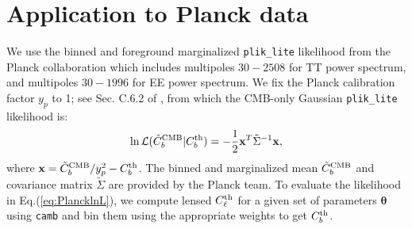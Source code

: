 \documentclass[amsmath, prd, reprint, aps]{revtex4-1}
\newcommand{\xv}{\textbf{x}}
\newcommand{\tv}{\bm{\theta}}
\begin{document}
\section{Application to Planck data} \label{sec:planck}
We use the binned and foreground marginalized \texttt{plik\_lite} likelihood from the Planck collaboration \cite{Aghanim:2015xee} which includes multipoles $30-2508$ for TT power spectrum, and multipoles $30-1996$ for EE power spectrum. We fix the Planck calibration factor $y_p$ to 1; see Sec. C.6.2 of \cite{Aghanim:2015xee}, from which the CMB-only Gaussian \texttt{plik\_lite} likelihood is:
\begin{align}
	\ln \mathcal{L}(\tilde{C}_b^{\rm CMB}|C_b^{\rm th}) = -\frac{1}{2}\xv^T \tilde{\Sigma}^{-1} \xv, \label{eq:PlancklnL}
\end{align}
where $\xv = \tilde{C}_b^{\rm CMB}/y_p^2 - C_b^{\rm th}$. The binned and marginalized mean $\tilde{C}_b^{\rm CMB}$ and covariance matrix $\tilde{\Sigma}$ are provided by the Planck team. To evaluate the likelihood in Eq.(\ref{eq:PlancklnL}), we compute lensed $C_\ell^{\rm th}$ for a given set of parameters $\tv$ using \texttt{camb} \cite{Lewis:1999bs,Howlett:2012mh} and bin them using the appropriate weights to get $C_b^{\rm th}$.
\end{document}
